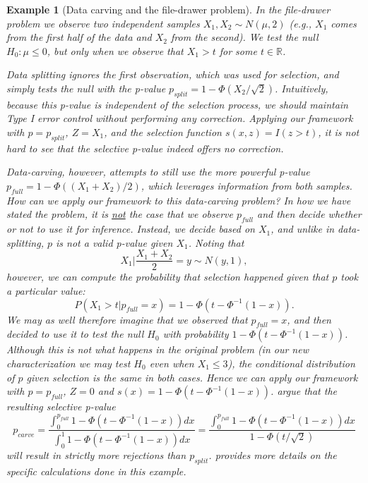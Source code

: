 \documentclass{article}
\newtheorem{example}{Example}
\newcommand{\R}{\mathbb{R}}
\begin{document}
\begin{example}[Data carving and the file-drawer problem]
    \label{exm:carve}
    In the file-drawer problem we observe two independent samples $X_1, X_2 \sim N(\mu, 2)$ (e.g., $X_1$ comes from the first half of the data and $X_2$ from the second). We test the null $H_0: \mu \leq 0$, but only when we observe that $X_1 > t$ for some $t \in \R$.  
    
    Data splitting ignores the first observation, which was used for selection, and simply tests the null with the  p-value $p_{split} = 1 - \Phi(X_2/\sqrt{2}) $. Intuitively, because this p-value is independent of the selection process, we should maintain Type I error control without performing any correction. Applying our framework with $p = p_{split}$, $Z = X_1$, and the selection function $s(x, z) = I(z > t)$, it is not hard to see that the selective p-value indeed offers no correction. 
    
    Data-carving, however, attempts to still use the more powerful p-value $p_{full} = 1 - \Phi( (X_1 + X_2)/2 )$, which leverages information from both samples. How can we apply our framework to this data-carving problem? In how we have stated the problem, it is \underline{not} the case that we observe $p_{full}$ and then decide whether or not to use it for inference. Instead, we decide based on $X_1$, and unlike in data-splitting, $p$ is not a valid p-value given $X_1$. Noting that
    \begin{equation*}
        X_1 | \frac{X_1 + X_2}{2} = y \sim N(y, 1),
    \end{equation*}
    however, we can compute the probability that selection happened given that $p$ took a particular value:
    \begin{equation*}
        P(X_1 > t | p_{full} = x) = 1 - \Phi(t - \Phi^{-1}(1-x)). 
    \end{equation*}
    We may as well therefore imagine that we observed that $p_{full} = x$, and then decided to use it to test the null $H_0$ with probability $1 - \Phi(t - \Phi^{-1}(1-x))$. Although this is not what happens in the original problem (in our new characterization we may test $H_0$ even when $X_1 \leq 3$), the conditional distribution of $p$ given selection is the same in both cases. Hence we can apply our framework with $p = p_{full}$, $Z=0$ and $s(x) = 1 - \Phi(t - \Phi^{-1}(1-x))$. \cite{Fithian2017} argue that the resulting selective p-value
    \begin{equation*}
        p_{carve} = \frac{\int_0^{p_{full}}  1 - \Phi(t - \Phi^{-1}(1-x)) dx}{\int_0^1  1 - \Phi(t - \Phi^{-1}(1-x)) dx} = \frac{\int_0^{p_{full}}  1 - \Phi(t - \Phi^{-1}(1-x))dx }{1 - \Phi(t/\sqrt{2})} 
    \end{equation*}
    will result in strictly more rejections than $p_{split}$.  provides more details on the specific calculations done in this example. 
\end{example}
\end{document}
